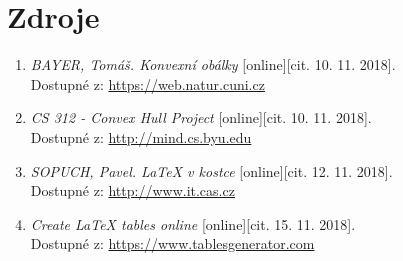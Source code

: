 \documentclass[a4paper, 12pt]{article}
\begin{document}
\section{Zdroje}
\begin{enumerate}
\item  \textsl{BAYER, Tomáš. Konvexní obálky} [online][cit. 10. 11. 2018].\\
Dostupné z: \href{https://web.natur.cuni.cz/~bayertom/images/courses/Adk/adk4.pdf}{https://web.natur.cuni.cz}

\item  \textsl{CS 312 - Convex Hull Project} [online][cit. 10. 11. 2018].\\
Dostupné z: \href{http://mind.cs.byu.edu/courses/312/projects/project2_files/ConvexHull_python.php}{http://mind.cs.byu.edu}

\item  \textsl{SOPUCH, Pavel. LaTeX v kostce} [online][cit. 12. 11. 2018].\\
Dostupné z: \href{http://www.it.cas.cz/manual/latex/}{http://www.it.cas.cz}

\item  \textsl{Create LaTeX tables online} [online][cit. 15. 11. 2018].\\
Dostupné z: \href{https://www.tablesgenerator.com/}{https://www.tablesgenerator.com}


\end{enumerate}
\end{document}
